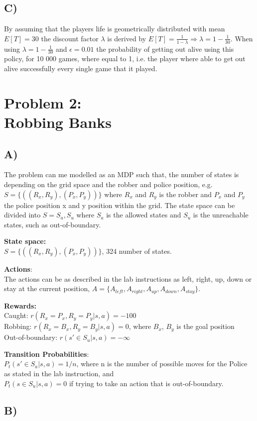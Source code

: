 \documentclass{article}
\begin{document}
\subsection*{C)}
By assuming that the players life is geometrically distributed with mean $E[T] = 30$ the discount factor $\lambda$ is derived by $E[T] =  \frac{1}{1 - \lambda} \Rightarrow \lambda = 1 - \frac{1}{30}$. When using $\lambda = 1 - \frac{1}{30}$ and $\epsilon = 0.01$ the probability of getting out alive using this policy, for 10 000 games, where equal to 1, i.e. the player where able to get out alive successfully every single game that it played.









\section*{Problem 2: \\
        Robbing Banks}
        
        
\subsection*{A)}
The problem can me modelled as an MDP such that, the number of states is depending on the grid space and the robber and police position, e.g. $S = \{((R_x, R_y),(P_x, P_y) )\} $ where $R_x$ and $R_y$ is the robber and $P_x$ and $P_y$ the police position x and y position within the grid. The state space can be divided into $S = {S_a, S_u}$ where $S_a$ is the allowed states and $S_u$ is the unreachable states, such as out-of-boundary.


\textbf{State space:}\\
$S = \{((R_x, R_y),(P_x, P_y) )\} $, 324 number of states. 

\textbf{Actions}: \\
The actions can be as described in the lab instructions as left, right, up, down or stay at the current position, $A = \{ A_{left}, A_{right}, A_{up}, A_{down}, A_{stay} \}$. 

\textbf{Rewards:} \\
Caught: $r(R_x = P_x , R_y = P_y |s,a) = -100 $\\ 
Robbing: $r(R_x = B_x , R_y = B_y |s,a) = 0 $, where $B_x$, $B_y$ is the goal position\\
Out-of-boundary: $r(s'\in S_u |s,a) = -\infty $

\textbf{Transition Probabilities}:\\
$P_t(s' \in S_a |s,a) = 1/n$, where n is the number of possible moves for the Police as stated in the lab instruction, and \\$P_t(s \in S_u |s,a) = 0$ if trying to take an action that is out-of-boundary. 

        


\subsection*{B)}
\end{document}
